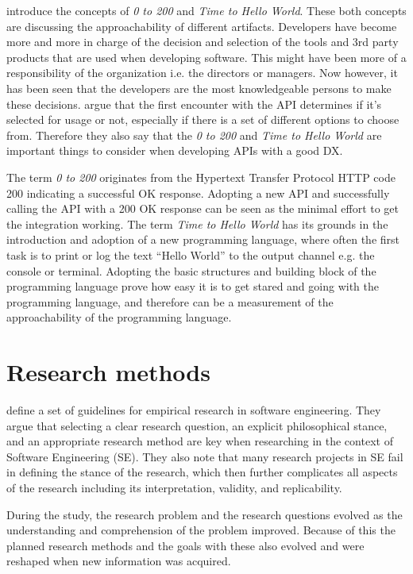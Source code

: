 \documentclass[english, 12pt, a4paper, sci, utf8, a-1b, online]{aaltothesis}
\begin{document}
\textcite{api-designers} introduce the concepts of \textit{0 to 200} and \textit{Time to Hello World}. These both concepts are discussing the approachability of different artifacts. Developers have become more and more in charge of the decision and selection of the tools and 3rd party products that are used when developing software. This might have been more of a responsibility of the organization i.e. the directors or managers. Now however, it has been seen that the developers are the most knowledgeable persons to make these decisions. \textcite{api-designers} argue that the first encounter with the API determines if it's selected for usage or not, especially if there is a set of different options to choose from. Therefore they also say that the \textit{0 to 200} and \textit{Time to Hello World} are important things to consider when developing APIs with a good DX.

The term \textit{0 to 200} originates from the Hypertext Transfer Protocol HTTP code 200 indicating a successful OK response. Adopting a new API and successfully calling the API with a 200 OK response can be seen as the minimal effort to get the integration working. The term \textit{Time to Hello World} has its grounds in the introduction and adoption of a new programming language, where often the first task is to print or log the text ``Hello World'' to the output channel e.g. the console or terminal. Adopting the basic structures and building block of the programming language prove how easy it is to get stared and going with the programming language, and therefore can be a measurement of the approachability of the programming language.

\clearpage
\section{Research methods} \label{section:research-methods}

\textcite{easterbrook2008selecting} define a set of guidelines for empirical research in software engineering. They argue that selecting a clear research question, an explicit philosophical stance, and an appropriate research method are key when researching in the context of Software Engineering (SE). They also note that many research projects in SE fail in defining the stance of the research, which then further complicates all aspects of the research including its interpretation, validity, and replicability.

During the study, the research problem and the research questions evolved as the understanding and comprehension of the problem improved. Because of this the planned research methods and the goals with these also evolved and were reshaped when new information was acquired.
\end{document}
